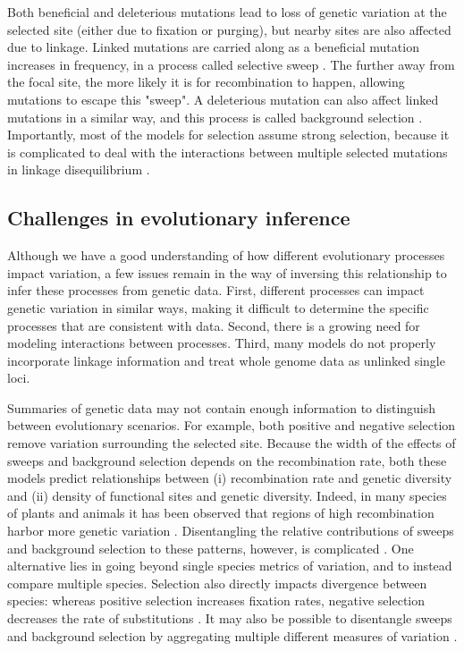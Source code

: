 Both beneficial and deleterious mutations lead to loss of genetic variation at the selected site (either due to fixation or purging),
but nearby sites are also affected due to linkage.
Linked mutations are carried along as a beneficial mutation increases in frequency, in a process called selective sweep \citep{kaplan_hitchhiking_1989, maynard_smith_hitch-hiking_1974, coop_patterns_2012}.
The further away from the focal site, the more likely it is for recombination to happen, allowing mutations to escape this "sweep".
A deleterious mutation can also affect linked mutations in a similar way, and this process is called background selection \citep{charlesworth_effect_1993}.
Importantly, most of the models for selection assume strong selection,
because it is complicated to deal with the interactions between multiple selected mutations in linkage disequilibrium \citep{kim_joint_2000}.

\subsection{Challenges in evolutionary inference}

Although we have a good understanding of how different evolutionary processes impact variation,
a few issues remain in the way of inversing this relationship to infer these processes from genetic data.
First, different processes can impact genetic variation in similar ways, making it difficult to determine the specific processes that are consistent with data.
Second, there is a growing need for modeling interactions between processes.
Third, many models do not properly incorporate linkage information and treat whole genome data as unlinked single loci.

Summaries of genetic data may not contain enough information to distinguish between evolutionary scenarios.
For example, both positive and negative selection remove variation surrounding the selected site.
Because the width of the effects of sweeps and background selection depends on the recombination rate,
both these models predict relationships between (i) recombination rate and genetic diversity and (ii) density of functional sites and genetic diversity.
Indeed, in many species of plants and animals it has been observed that regions of high recombination harbor more genetic variation \citep{corbett-detig_natural_2015}.
Disentangling the relative contributions of sweeps and background selection to these patterns, however, is complicated \citep{leffler_revisiting_2012, andolfatto_adaptive_2001}.
One alternative lies in going beyond single species metrics of variation, and to instead compare multiple species.
Selection also directly impacts divergence between species: whereas positive selection increases fixation rates, 
negative selection decreases the rate of substitutions \citep{andolfatto_hitchhiking_2007,macpherson_genomewide_2007,cai_pervasive_2009} .
It may also be possible to disentangle sweeps and background selection by aggregating multiple different measures of variation \citep{schrider_background_2020}. %

